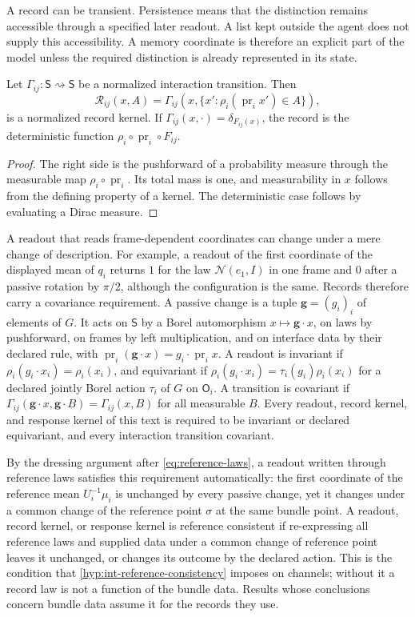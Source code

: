 A record can be transient. Persistence means that the distinction remains accessible through a specified later readout. A list kept outside the agent does not supply this accessibility. A memory coordinate is therefore an explicit part of the model unless the required distinction is already represented in its state.

Let $\Gamma_{ij}:\mathsf S\rightsquigarrow\mathsf S$ be a normalized interaction transition. Then
\begin{equation}
\mathcal R_{ij}(x,A)
=\Gamma_{ij}\left(x,\{x':\rho_i(\operatorname{pr}_i x')\in A\}\right),
\label{eq:record-kernel}
\end{equation}
is a normalized record kernel. If $\Gamma_{ij}(x,\cdot)=\delta_{F_{ij}(x)}$, the record is the deterministic function $\rho_i\circ\operatorname{pr}_i\circ F_{ij}$.
\begin{proof}
The right side is the pushforward of a probability measure through the measurable map $\rho_i\circ\operatorname{pr}_i$. Its total mass is one, and measurability in $x$ follows from the defining property of a kernel. The deterministic case follows by evaluating a Dirac measure.
\end{proof}

A readout that reads frame-dependent coordinates can change under a mere change of description. For example, a readout of the first coordinate of the displayed mean of $q_i$ returns $1$ for the law $\mathcal N(e_1,I)$ in one frame and $0$ after a passive rotation by $\pi/2$, although the configuration is the same. Records therefore carry a covariance requirement. A passive change is a tuple $\mathbf g=(g_i)_i$ of elements of $G$. It acts on $\mathsf S$ by a Borel automorphism $x\mapsto\mathbf g\cdot x$, on laws by pushforward, on frames by left multiplication, and on interface data by their declared rule, with $\operatorname{pr}_i(\mathbf g\cdot x)=g_i\cdot\operatorname{pr}_ix$. A readout is invariant if $\rho_i(g_i\cdot x_i)=\rho_i(x_i)$, and equivariant if $\rho_i(g_i\cdot x_i)=\tau_i(g_i)\rho_i(x_i)$ for a declared jointly Borel action $\tau_i$ of $G$ on $\mathsf O_i$. A transition is covariant if $\Gamma_{ij}(\mathbf g\cdot x,\mathbf g\cdot B)=\Gamma_{ij}(x,B)$ for all measurable $B$. Every readout, record kernel, and response kernel of this text is required to be invariant or declared equivariant, and every interaction transition covariant.

By the dressing argument after \cref{eq:reference-laws}, a readout written through reference laws satisfies this requirement automatically: the first coordinate of the reference mean $U_i^{-1}\mu_i$ is unchanged by every passive change, yet it changes under a common change of the reference point $\sigma$ at the same bundle point. A readout, record kernel, or response kernel is reference consistent if re-expressing all reference laws and supplied data under a common change of reference point leaves it unchanged, or changes its outcome by the declared action. This is the condition that \cref{hyp:int-reference-consistency} imposes on channels; without it a record law is not a function of the bundle data. Results whose conclusions concern bundle data assume it for the records they use.

